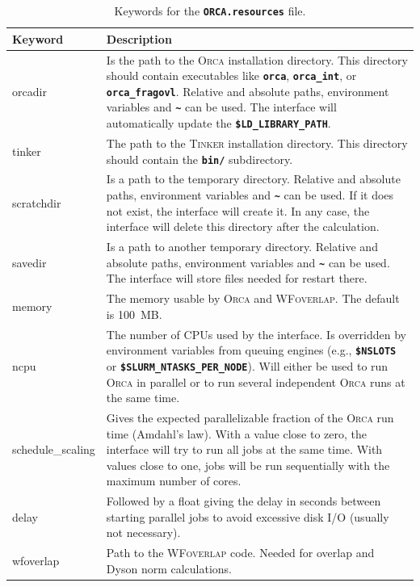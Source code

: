 \documentclass[a4paper,10pt,DIV=15,openany]{scrbook}
\newcommand{\ttt}[1]{\textbf{\texttt{#1}}}
\begin{document}
\begin{table}
  \centering
  \caption{Keywords for the \ttt{ORCA.resources} file.}
  \label{tab:orca_sh2}
  \begin{tabular}{>{\ttfamily}lp{12cm}}
  \hline
  Keyword       &Description\\
  \hline
orcadir                 &Is the path to the \textsc{Orca} installation directory. This directory should contain executables like \ttt{orca}, \ttt{orca\_int}, or \ttt{orca\_fragovl}. Relative and absolute paths, environment variables and \ttt{\textasciitilde} can be used. The interface will automatically update the \ttt{\$LD\_LIBRARY\_PATH}. 
\\
tinker                  &The path to the \textsc{Tinker} installation directory. This directory should contain the \ttt{bin/} subdirectory.
\\
scratchdir              &Is a path to the temporary directory. Relative and absolute paths, environment variables and \ttt{\textasciitilde} can be used. If it does not exist, the interface will create it. In any case, the interface will delete this directory after the calculation. 
\\
savedir                 &Is a path to another temporary directory.  Relative and absolute paths, environment variables and \ttt{\textasciitilde} can be used. The interface will store files needed for restart there.
\\
memory                  &The memory usable by \textsc{Orca} and \textsc{WFoverlap}. The default is 100~MB. 
\\
ncpu                    &The number of CPUs used by the interface. Is overridden by environment variables from queuing engines (e.g., \ttt{\$NSLOTS} or \ttt{\$SLURM\_NTASKS\_PER\_NODE}). Will either be used to run \textsc{Orca} in parallel or to run several independent \textsc{Orca} runs at the same time.
\\
schedule\_scaling       &Gives the expected parallelizable fraction of the \textsc{Orca} run time (Amdahl's law). With a value close to zero, the interface will try to run all jobs at the same time. With values close to one, jobs will be run sequentially with the maximum number of cores.
\\
delay                   &Followed by a float giving the delay in seconds between starting parallel jobs to avoid excessive disk I/O (usually not necessary).
\\
wfoverlap               &Path to the \textsc{WFoverlap} code. Needed for overlap and Dyson norm calculations.

\end{tabular}
\end{table}
\end{document}
